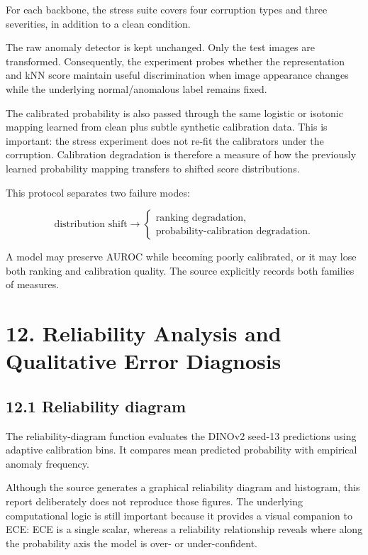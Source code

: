 \documentclass[
  11pt,
]{article}
\begin{document}
For each backbone, the stress suite covers four corruption types and
three severities, in addition to a clean condition.

The raw anomaly detector is kept unchanged. Only the test images are
transformed. Consequently, the experiment probes whether the
representation and kNN score maintain useful discrimination when image
appearance changes while the underlying normal/anomalous label remains
fixed.

The calibrated probability is also passed through the same logistic or
isotonic mapping learned from clean plus subtle synthetic calibration
data. This is important: the stress experiment does not re-fit the
calibrators under the corruption. Calibration degradation is therefore a
measure of how the previously learned probability mapping transfers to
shifted score distributions.

This protocol separates two failure modes:

\[
\text{distribution shift}
\rightarrow
\begin{cases}
\text{ranking degradation},\\
\text{probability-calibration degradation}.
\end{cases}
\]

A model may preserve AUROC while becoming poorly calibrated, or it may
lose both ranking and calibration quality. The source explicitly records
both families of measures.

\section{12. Reliability Analysis and Qualitative Error
Diagnosis}\label{reliability-analysis-and-qualitative-error-diagnosis}

\subsection{12.1 Reliability diagram}\label{reliability-diagram}

The reliability-diagram function evaluates the DINOv2 seed-13
predictions using adaptive calibration bins. It compares mean predicted
probability with empirical anomaly frequency.

Although the source generates a graphical reliability diagram and
histogram, this report deliberately does not reproduce those figures.
The underlying computational logic is still important because it
provides a visual companion to ECE: ECE is a single scalar, whereas a
reliability relationship reveals where along the probability axis the
model is over- or under-confident.
\end{document}
